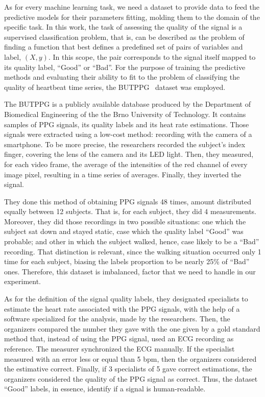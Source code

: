 As for every machine learning task, we need a dataset to provide data to feed the predictive models for their parameters fitting, molding them to the domain of the specific task. In this work, the task of assessing the quality of the signal is a supervised classification problem, that is, can be described as the problem of finding a function that best defines a predefined set of pairs of variables and label, $(X,y)$. In this scope, the pair corresponds to the signal itself mapped to its quality label, ``Good'' or ``Bad''. For the purpose of training the predictive methods and evaluating their ability to fit to the problem of classifying the quality of heartbeat time series, the \gls{BUTPPG}~\cite{butppg} dataset was employed.

%

The \gls{BUTPPG} is a publicly available database produced by the Department of Biomedical Engineering of the the Brno University of Technology. It contains samples of \gls{PPG} signals, its quality labels and its heat rate estimations. Those signals were extracted using a low-cost method: recording with the camera of a smartphone. To be more precise, the researchers recorded the subject's index finger, covering the lens of the camera and its \gls{LED} light. Then, they measured, for each video frame, the average of the intensities of the red channel of every image pixel, resulting in a time series of averages. Finally, they inverted the signal. %

They done this method of obtaining \gls{PPG} signals  48 times, amount distributed equally between 12 subjects. That is, for each subject, they did 4 measurements. Moreover, they did those recordings in two possible situations: one which the subject sat down and stayed static, case which the quality label ``Good'' was probable; and other in which the subject walked, hence, case likely to be a ``Bad'' recording. That distinction is relevant, since the walking situation occurred only 1 time for each subject, biasing the labels proportion to be nearly 25\% of ``Bad'' ones. Therefore, this dataset is imbalanced, factor that we need to handle in our experiment.

As for the definition of the signal quality labels, they designated specialists to estimate the heart rate associated with the \gls{PPG} signals, with the help of a software specialized for the analysis, made by the researchers. Then, the organizers compared the number they gave with the one given by a gold standard method that, instead of using the \gls{PPG} signal, used an ECG recording as reference. The measurer synchronized the ECG manually. If the specialist measured with an error less or equal than 5 bpm, then the organizers considered the estimative correct. Finally, if 3 specialists of 5 gave correct estimations, the organizers considered the quality of the \gls{PPG} signal as correct. Thus, the dataset ``Good'' labels, in essence, identify if a signal is human-readable. 

